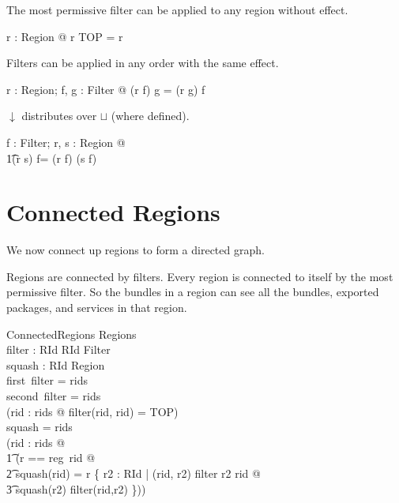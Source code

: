 \documentclass[a4paper,9pt]{article}
\begin{document}
The most permissive filter can be applied to any region without effect.
\begin{argue}
  \shows \forall r : Region @ r \downarrow TOP = r \\
\end{argue}

Filters can be applied in any order with the same effect.
\begin{argue}
  \shows \forall r : Region; f, g : Filter @ (r \downarrow f) \downarrow g = (r \downarrow g) \downarrow f \\
\end{argue}

$\downarrow$ distributes over $\sqcup$ (where defined).
\begin{argue}
  \shows \forall f : Filter; r, s : Region @ \\
\t1(r \sqcup s) \downarrow f= (r \downarrow f) \sqcup (s \downarrow f) \\
\end{argue}

\clearpage
\section{Connected Regions}
\label{cha:connregions}

We now connect up regions to form a directed graph.

Regions are connected by filters.
Every region is connected to itself by the most permissive filter.
So the bundles in a region can see all the bundles, exported packages, and services in that region.
\begin{schema}{ConnectedRegions}
  Regions \\
  filter : RId \cross RId \pfun Filter \\
  squash : RId \pfun Region \\
\where
  first~\limg \dom filter \rimg = rids \\
  second~\limg \dom filter \rimg = rids \\
  (\forall rid : rids @ filter(rid, rid) = TOP) \\
  \dom squash = rids \\
  (\forall rid : rids @ \\
\t1 (\LET r == reg~rid @ \\
\t2 squash(rid) = r \sqcup \bigsqcup \{ r2 : RId | (rid, r2) \in \dom filter \land r2 \neq rid @ \\
\t3 squash(r2) \downarrow filter(rid,r2) \}))\\
\end{schema}
\end{document}
